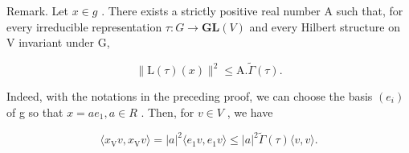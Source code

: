 Remark. Let \(x \in g\) . There exists a strictly positive real number A such that, for every irreducible representation \(\tau : G \to \mathbf{GL}(V)\) and every Hilbert structure on V invariant under G,

\[
\| \mathrm{L} (\tau) (x) \| ^ {2} \leq \mathrm{A}. \tilde {\Gamma} (\tau).
\]

Indeed, with the notations in the preceding proof, we can choose the basis \((e_{i})\) of g so that \(x = ae_{1}, a \in R\) . Then, for \(v \in V\) , we have

\[
\langle x _ {\mathrm{V}} v, x _ {\mathrm{V}} v \rangle = | a | ^ {2} \langle e _ {1} v, e _ {1} v \rangle \leq | a | ^ {2} \tilde {\Gamma} (\tau) \langle v, v \rangle .
\]

